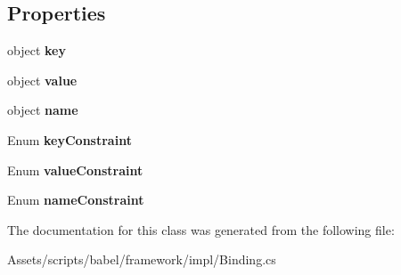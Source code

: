 \subsection*{Properties}
\begin{DoxyCompactItemize}
\item 
\hypertarget{classbabel_1_1framework_1_1impl_1_1_binding_a458cb215336f5aeda7edcd7fdefa9e2c}{object {\bfseries key}}\label{classbabel_1_1framework_1_1impl_1_1_binding_a458cb215336f5aeda7edcd7fdefa9e2c}

\item 
\hypertarget{classbabel_1_1framework_1_1impl_1_1_binding_a9a37e8b5b0098334e3d52151938010d8}{object {\bfseries value}}\label{classbabel_1_1framework_1_1impl_1_1_binding_a9a37e8b5b0098334e3d52151938010d8}

\item 
\hypertarget{classbabel_1_1framework_1_1impl_1_1_binding_a709db18af8280a835bc54280eb301fd5}{object {\bfseries name}}\label{classbabel_1_1framework_1_1impl_1_1_binding_a709db18af8280a835bc54280eb301fd5}

\item 
\hypertarget{classbabel_1_1framework_1_1impl_1_1_binding_adcba2638abf7e5e99c27aa48c88457ac}{Enum {\bfseries key\-Constraint}}\label{classbabel_1_1framework_1_1impl_1_1_binding_adcba2638abf7e5e99c27aa48c88457ac}

\item 
\hypertarget{classbabel_1_1framework_1_1impl_1_1_binding_a1580c316d12c17075c48cfb3beb94820}{Enum {\bfseries value\-Constraint}}\label{classbabel_1_1framework_1_1impl_1_1_binding_a1580c316d12c17075c48cfb3beb94820}

\item 
\hypertarget{classbabel_1_1framework_1_1impl_1_1_binding_adfd4b565f60dd5874c267bbf6b22a486}{Enum {\bfseries name\-Constraint}}\label{classbabel_1_1framework_1_1impl_1_1_binding_adfd4b565f60dd5874c267bbf6b22a486}

\end{DoxyCompactItemize}


The documentation for this class was generated from the following file\-:\begin{DoxyCompactItemize}
\item 
Assets/scripts/babel/framework/impl/Binding.\-cs\end{DoxyCompactItemize}
